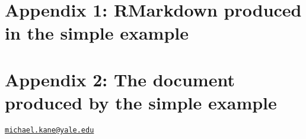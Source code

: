 \pagebreak

\hypertarget{appendix-1-rmarkdown-produced-in-the-simple-example}{%
\section{Appendix 1: RMarkdown produced in the simple
example}\label{appendix-1-rmarkdown-produced-in-the-simple-example}}

\begin{Schunk}
\end{Schunk}

\pagebreak

\hypertarget{appendix-2-the-document-produced-by-the-simple-example}{%
\section{Appendix 2: The document produced by the simple
example}\label{appendix-2-the-document-produced-by-the-simple-example}}




\address{%
Michael Kane\\
Yale University\\
60 College Street\\ New Haven, CT 06510, USA\\
}
\href{mailto:michael.kane@yale.edu}{\nolinkurl{michael.kane@yale.edu}}

